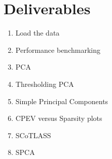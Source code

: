 \documentclass[12pt,letterpaper]{article}
\begin{document}
\maketitle
\section*{Deliverables}
\begin{enumerate}
\item Load the data
\item Performance benchmarking
\item PCA
\item Thresholding PCA
\item Simple Principal Components
\item CPEV versus Sparsity plots
\item SCoTLASS
\item SPCA
\end{enumerate}
\end{document}
